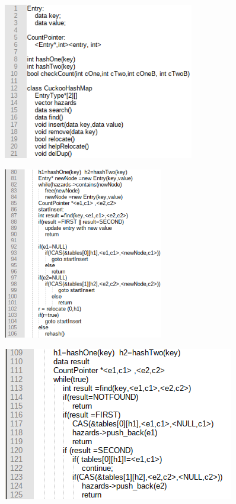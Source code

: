 \documentclass{article}
\begin{document}
\begin{center}
\includegraphics[width=3.278in,height=2.6984in]{Report-img003.png}
\end{center}

\bigskip


\bigskip



\begin{center}
\includegraphics[width=2.7445in,height=2.9634in]{Report-img004.png}
\end{center}
\begin{center}
\includegraphics[width=3.9791in,height=2.6457in]{Report-img005.png}
\end{center}
\end{document}
